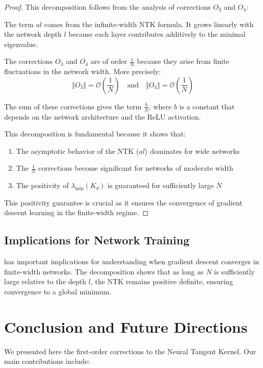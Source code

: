 \documentclass[11pt,a4paper]{article}
\theoremstyle{definition}
\begin{document}
\begin{proof}
This decomposition follows from the analysis of corrections $O_3$ and $O_4$:

The term $al$ comes from the infinite-width NTK formula. It grows linearly with the network depth $l$ because each layer contributes additively to the minimal eigenvalue.

The corrections $O_3$ and $O_4$ are of order $\frac{1}{N}$ because they arise from finite fluctuations in the network width. More precisely:
\[ \Vert O_3 \Vert = \mathcal{O}(\frac{1}{N}) \quad \text{and} \quad \Vert O_4 \Vert = \mathcal{O}(\frac{1}{N}) \]

The sum of these corrections gives the term $\frac{b}{N}$, where $b$ is a constant that depends on the network architecture and the ReLU activation.

This decomposition is fundamental because it shows that:
\begin{enumerate}
\item The asymptotic behavior of the NTK ($al$) dominates for wide networks
\item The $\frac{1}{N}$ corrections become significant for networks of moderate width
\item The positivity of $\lambda_{\min}(K_\theta)$ is guaranteed for sufficiently large $N$
\end{enumerate}

This positivity guarantee is crucial as it ensures the convergence of gradient descent learning in the finite-width regime.
\end{proof}

\subsection{Implications for Network Training}

 has important implications for understanding when gradient descent converges in finite-width networks. The decomposition shows that as long as $N$ is sufficiently large relative to the depth $l$, the NTK remains positive definite, ensuring convergence to a global minimum.

\newpage

\section{Conclusion and Future Directions}

We presented here the first-order corrections to the Neural Tangent Kernel. Our main contributions include:
\end{document}
